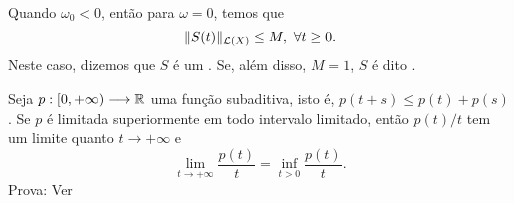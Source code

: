 \begin{remark}
Quando $\omega_0<0$, então para $\omega=0$, temos que 
\[\|S(t)\|_{\mathcal{L}(X)}\leq M,\ \forall t\geq 0. \]
Neste caso, dizemos que $S$ é um . Se, além disso, $M=1$, $S$ é dito . 
    
\end{remark}


\begin{lemma}\label{lem2.5}
    Seja $p:[0,+\infty)\longrightarrow \mathbb{R}$ uma função {subaditiva}, isto é, $p(t+s)\leq p(t)+p(s)$. Se $p$ é limitada superiormente em todo intervalo limitado, então $p(t)/t$ tem um limite quanto $t\to +\infty$ e 
    \[\lim\limits_{t\to +\infty}\frac{p(t)}{t}=\inf\limits_{t>0}\frac{p(t)}{t}.\]
Prova: Ver \cite[Lema 1.2.5]{gomes1985semigrupos} 
\end{lemma}


